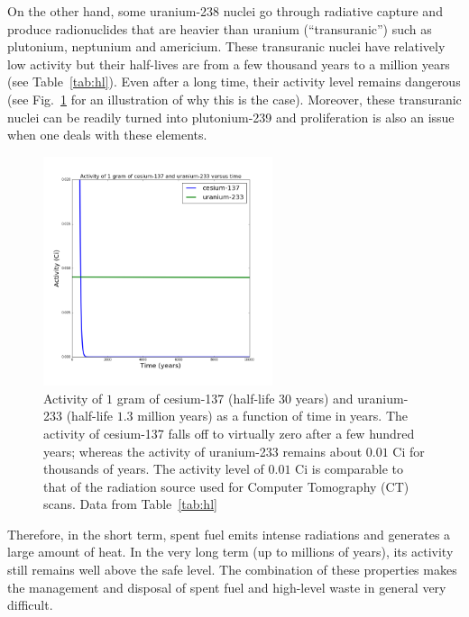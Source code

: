\documentclass[nofootinbib,preprint,aps]{revtex4-1}
\begin{document}
        On the other hand, some uranium-238 nuclei go through radiative capture
        and produce radionuclides that are
        heavier than uranium (``transuranic'') such as plutonium, neptunium and americium.
        These transuranic nuclei have relatively low activity but their half-lives are from a few thousand years
        to a million years (see Table~\ref{tab:hl}).
        Even after a long time, their activity level remains dangerous (see Fig.~\ref{fig:csru} for
        an illustration of why this is the case).
        Moreover, these transuranic nuclei can be readily turned into plutonium-239 and proliferation is also
        an issue when one deals with these elements.
        \begin{figure}[h]
            \centering
            \includegraphics[width=0.6\textwidth]{csur.png}
            \caption{Activity of $1$ gram of cesium-137 (half-life $30$ years) and uranium-233 (half-life $1.3$ million
            years) as a function of time in years. The activity of cesium-137 falls off to virtually zero after a few
        hundred years; whereas the activity of uranium-233 remains about $0.01$ Ci for thousands of years. The activity
    level of $0.01$ Ci is comparable to that of the radiation source used for Computer Tomography (CT) scans.
Data from Table~\ref{tab:hl}}
            \label{fig:csru}
        \end{figure}
        Therefore, in the short term, spent fuel emits intense radiations and generates a large amount of heat.
        In the very long term (up to millions of years), its activity still remains well above the safe level.
        The combination of these properties makes the management and disposal of spent fuel and high-level waste
        in general very difficult.
\end{document}

